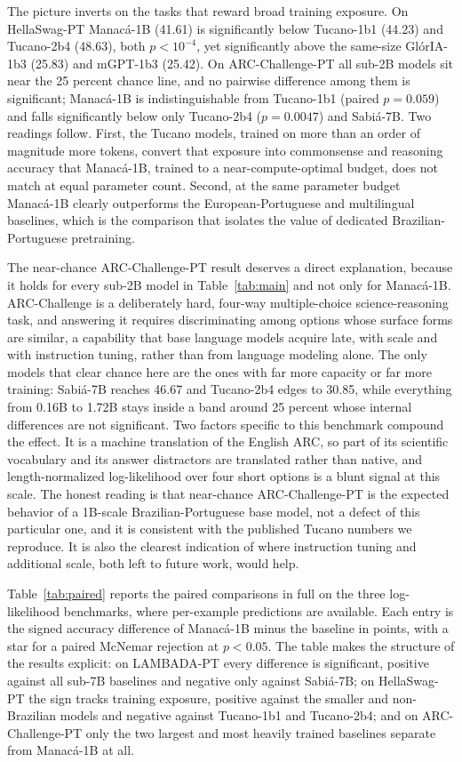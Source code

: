 \documentclass[11pt]{article}
\begin{document}
The picture inverts on the tasks that reward broad training exposure. On HellaSwag-PT
Manac\'a-1B (41.61) is significantly below Tucano-1b1 (44.23) and Tucano-2b4 (48.63),
both $p<10^{-4}$, yet significantly above the same-size Gl\'orIA-1b3 (25.83) and
mGPT-1b3 (25.42). On ARC-Challenge-PT all sub-2B models sit near the 25 percent chance
line, and no pairwise difference among them is significant; Manac\'a-1B is
indistinguishable from Tucano-1b1 (paired $p=0.059$) and falls significantly below
only Tucano-2b4 ($p=0.0047$) and Sabi\'a-7B. Two readings follow. First, the Tucano
models, trained on more than an order of magnitude more tokens, convert that exposure
into commonsense and reasoning accuracy that Manac\'a-1B, trained to a
near-compute-optimal budget, does not match at equal parameter count. Second, at the
same parameter budget Manac\'a-1B clearly outperforms
the European-Portuguese and multilingual baselines, which is the comparison that
isolates the value of dedicated Brazilian-Portuguese pretraining.

The near-chance ARC-Challenge-PT result deserves a direct explanation, because it holds
for every sub-2B model in Table~\ref{tab:main} and not only for Manac\'a-1B.
ARC-Challenge is a deliberately hard, four-way multiple-choice science-reasoning task,
and answering it requires discriminating among options whose surface forms are similar,
a capability that base language models acquire late, with scale and with instruction
tuning, rather than from language modeling alone. The only models that clear chance
here are the ones with far more capacity or far more training: Sabi\'a-7B reaches 46.67
and Tucano-2b4 edges to 30.85, while everything from 0.16B to 1.72B stays inside a band
around 25 percent whose internal differences are not significant. Two factors specific
to this benchmark compound the effect. It is a machine translation of the English ARC,
so part of its scientific vocabulary and its answer distractors are translated rather
than native, and length-normalized log-likelihood over four short options is a blunt
signal at this scale. The honest reading is that near-chance ARC-Challenge-PT is the
expected behavior of a 1B-scale Brazilian-Portuguese base model, not a defect of this
particular one, and it is consistent with the published Tucano numbers we reproduce.
It is also the clearest indication of where instruction tuning and additional scale,
both left to future work, would help.

Table~\ref{tab:paired} reports the paired comparisons in full on the three
log-likelihood benchmarks, where per-example predictions are available. Each entry is
the signed accuracy difference of Manac\'a-1B minus the baseline in points, with a star
for a paired McNemar rejection at $p<0.05$. The table makes the structure of the
results explicit: on LAMBADA-PT every difference is significant, positive against all
sub-7B baselines and negative only against Sabi\'a-7B; on HellaSwag-PT the sign tracks
training exposure, positive against the smaller and non-Brazilian models and negative
against Tucano-1b1 and Tucano-2b4; and on ARC-Challenge-PT only the two largest and
most heavily trained baselines separate from Manac\'a-1B at all.
\end{document}
